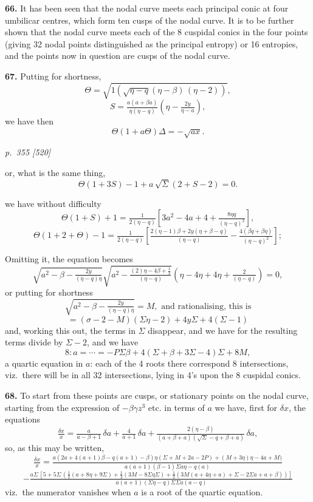 \documentclass[11pt,a4paper]{article}
\theoremstyle{plain}
\theoremstyle{definition}
\begin{document}
\textbf{66.} It has been seen that the nodal curve meets each principal conic at four umbilicar centres, which form ten cusps of the nodal curve. It is to be further shown that the nodal curve meets each of the 8 cuspidal conics in the four points (giving 32 nodal points distinguished as the principal entropy) or 16 entropies, and the points now in question are cusps of the nodal curve.

\textbf{67.} Putting for shortness,
\[
\Theta = \sqrt{1\!\left(\!\sqrt{\eta - q}(\eta - \beta)\,(\eta - 2)\right)},
\]
\[
S = \tfrac{a(a + \beta a)}{\eta(\eta - q)}\!\left(\eta - \tfrac{2y}{\eta - a}\right),
\]
we have then
\[
\Theta(1 + a\Theta)\Delta = -\sqrt{a x}.
\]

\clearpage

\bigskip
\textit{p.~355 [520]}
\smallskip

or, what is the same thing,
\[
\Theta(1 + 3S) - 1 + a\,\sqrt{\Sigma}(2 + S - 2) = 0.
\]

we have without difficulty
\[
\Theta(1 + S) + 1 = \tfrac{1}{2(\eta - q)}[3a^2 - 4a + 4 + \tfrac{8\eta q}{(\eta - q)^2}],
\]
\[
\Theta(1 + 2 + \Theta) - 1 = \tfrac{1}{2(\eta - q)}\!\left[\tfrac{2(\eta - 1)\beta + 2y(\eta + \beta - q)}{(\eta - q)} - \tfrac{4(\beta q + \beta\eta)}{(\eta - q)^2}\right];
\]

Omitting it, the equation becomes
\[
\sqrt{a^2 - \beta - \tfrac{2y}{(\eta - q)\eta}}\sqrt{a^2 - \tfrac{(2)\eta - 4\beta + \tfrac{1}{2}}{(\eta - q)}}\!\left(\eta - 4\eta + 4\eta + \tfrac{2}{(\eta - q)}\right) = 0,
\]
or putting for shortness
\[
\sqrt{a^2 - \beta - \tfrac{2y}{(\eta - q)\eta}} = M,\text{ and rationalising, this is}
\]
\[
= (\sigma - 2 - M)(\Sigma\eta - 2) + 4y\Sigma + 4(\Sigma - 1)
\]
and, working this out, the terms in $\Sigma$ disappear, and we have for the resulting terms divide by $\Sigma - 2$, and we have
\[
8 : a = \cdots = -P\Sigma\beta + 4(\Sigma + \beta + 3\Sigma - 4)\Sigma + 8M,
\]
a quartic equation in $a$: each of the 4 roots there correspond 8 intersections, viz.\ there will be in all 32 intersections, lying in 4's upon the 8 cuspidal conics.

\textbf{68.} To start from these points are cusps, or stationary points on the nodal curve, starting from the expression of $-\beta\gamma z^3$ etc. in terms of $a$ we have, first for $\delta x$, the equations
\[
\tfrac{\delta x}{x} = \tfrac{a}{a - \beta + 1}\,\delta a + \tfrac{4}{a + 1}\,\delta a + \tfrac{2(\eta - \beta)}{(a + \beta + a)(\sqrt{\Sigma} - q + \beta + a)}\,\delta a,
\]
so, as this may be written,
\[
\tfrac{\delta x}{x} = \tfrac{a(2a + 4(a + 1)\beta - q(a + 1) - \beta)\eta(\Sigma + M + 2a - 2P) + (M + 3\eta)\eta - 4a + M)}{a(a + 1)(\beta - 1)\Sigma a\eta - q(a)}
\]
\[
- \tfrac{a\Sigma\,[5 + 5\Sigma\,(\tfrac{1}{2}(a + 8\eta + 9\Sigma) + \tfrac{1}{2}(3M - 8\Sigma\eta\Sigma) + \tfrac{1}{2}(3M(a + 4\eta + a) + \Sigma - 2\Sigma a + a + \beta))]}{a(a + 1)(\Sigma\eta - q)\Sigma\Sigma a(a - q)}
\]
viz.\ the numerator vanishes when $a$ is a root of the quartic equation.
\end{document}
